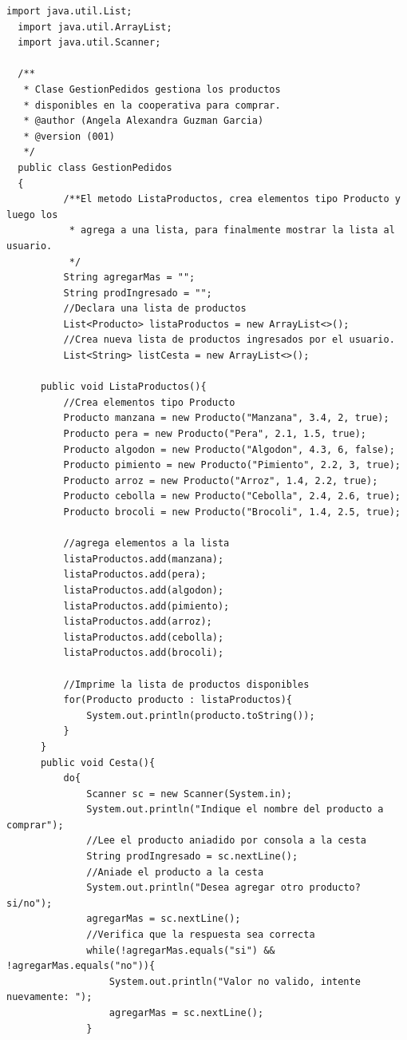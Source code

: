 \documentclass[10pt,a4paper]{article}
\def\StartLineAt#1{\lstset{firstnumber=#1}}
\begin{document}
\StartLineAt{1}
\begin{lstlisting}[style=Java]
  import java.util.List;
  import java.util.ArrayList;
  import java.util.Scanner;
  
  /**
   * Clase GestionPedidos gestiona los productos 
   * disponibles en la cooperativa para comprar.
   * @author (Angela Alexandra Guzman Garcia) 
   * @version (001)
   */
  public class GestionPedidos
  {
          /**El metodo ListaProductos, crea elementos tipo Producto y luego los 
           * agrega a una lista, para finalmente mostrar la lista al usuario.
           */
          String agregarMas = "";
          String prodIngresado = "";
          //Declara una lista de productos
          List<Producto> listaProductos = new ArrayList<>();
          //Crea nueva lista de productos ingresados por el usuario.
          List<String> listCesta = new ArrayList<>();
          
      public void ListaProductos(){
          //Crea elementos tipo Producto
          Producto manzana = new Producto("Manzana", 3.4, 2, true);
          Producto pera = new Producto("Pera", 2.1, 1.5, true);
          Producto algodon = new Producto("Algodon", 4.3, 6, false);
          Producto pimiento = new Producto("Pimiento", 2.2, 3, true);
          Producto arroz = new Producto("Arroz", 1.4, 2.2, true);
          Producto cebolla = new Producto("Cebolla", 2.4, 2.6, true);
          Producto brocoli = new Producto("Brocoli", 1.4, 2.5, true);
  
          //agrega elementos a la lista
          listaProductos.add(manzana);
          listaProductos.add(pera);
          listaProductos.add(algodon);
          listaProductos.add(pimiento);
          listaProductos.add(arroz);
          listaProductos.add(cebolla);
          listaProductos.add(brocoli);
          
          //Imprime la lista de productos disponibles
          for(Producto producto : listaProductos){
              System.out.println(producto.toString());
          }   
      }   
      public void Cesta(){
          do{
              Scanner sc = new Scanner(System.in);
              System.out.println("Indique el nombre del producto a comprar");
              //Lee el producto aniadido por consola a la cesta
              String prodIngresado = sc.nextLine();
              //Aniade el producto a la cesta
              System.out.println("Desea agregar otro producto? si/no");
              agregarMas = sc.nextLine();
              //Verifica que la respuesta sea correcta
              while(!agregarMas.equals("si") && !agregarMas.equals("no")){
                  System.out.println("Valor no valido, intente nuevamente: ");
                  agregarMas = sc.nextLine();
              }
              

\end{lstlisting}
\end{document}
